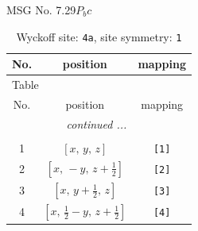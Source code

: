 \documentclass[fleqn,8pt]{jsarticle}
\begin{document}
\setcounter{MaxMatrixCols}{32}

\renewcommand{\tablename}{Table~}
\renewcommand{\figurename}{Figure~}
\begin{center}
\LARGE
MSG No. 7.29\quad$P_{b}c$
\end{center}
\renewcommand{\arraystretch}{1.2}
\begin{longtable}{ccc}
\caption{Wyckoff site: {\tt 4a}, site symmetry: {\tt 1}}
 \\
 \hline \hline
No. & position & mapping \\ \hline \endfirsthead

\multicolumn{2}{l}{\tablename\ \thetable{}} \\
 \hline \hline
No. & position & mapping \\ \hline \endhead

 \hline \hline
\multicolumn{2}{r}{\footnotesize\it continued ...} \\ \endfoot

 \hline \hline
\multicolumn{2}{r}{} \\ \endlastfoot

1 & $\left[ x,\, y,\, z \right]$ & {\tt [1]} \\ \hline
2 & $\left[ x,\, - y,\, z + \frac{1}{2} \right]$ & {\tt [2]} \\ \hline
3 & $\left[ x,\, y + \frac{1}{2},\, z \right]$ & {\tt [3]} \\ \hline
4 & $\left[ x,\, \frac{1}{2} - y,\, z + \frac{1}{2} \right]$ & {\tt [4]} \\
\end{longtable}
\end{document}
